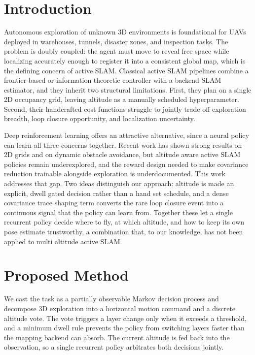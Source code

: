 \documentclass[runningheads]{llncs}
\begin{document}
\section{Introduction}

Autonomous exploration of unknown 3D environments is foundational for UAVs deployed in warehouses, tunnels, disaster zones, and inspection tasks. The problem is doubly coupled: the agent must move to reveal free space while localizing accurately enough to register it into a consistent global map, which is the defining concern of active SLAM. Classical active SLAM pipelines combine a frontier based or information theoretic controller with a backend SLAM estimator, and they inherit two structural limitations. First, they plan on a single 2D occupancy grid, leaving altitude as a manually scheduled hyperparameter. Second, their handcrafted cost functions struggle to jointly trade off exploration breadth, loop closure opportunity, and localization uncertainty.

Deep reinforcement learning offers an attractive alternative, since a neural policy can learn all three concerns together. Recent work has shown strong results on 2D grids and on dynamic obstacle avoidance, but altitude aware active SLAM policies remain underexplored, and the reward design needed to make covariance reduction trainable alongside exploration is underdocumented. This work addresses that gap. Two ideas distinguish our approach: altitude is made an explicit, dwell gated decision rather than a hand set schedule, and a dense covariance trace shaping term converts the rare loop closure event into a continuous signal that the policy can learn from. Together these let a single recurrent policy decide where to fly, at which altitude, and how to keep its own pose estimate trustworthy, a combination that, to our knowledge, has not been applied to multi altitude active SLAM.

\section{Proposed Method}

We cast the task as a partially observable Markov decision process and decompose 3D exploration into a horizontal motion command and a discrete altitude vote. The vote triggers a layer change only when it exceeds a threshold, and a minimum dwell rule prevents the policy from switching layers faster than the mapping backend can absorb. The current altitude is fed back into the observation, so a single recurrent policy arbitrates both decisions jointly.
\end{document}
